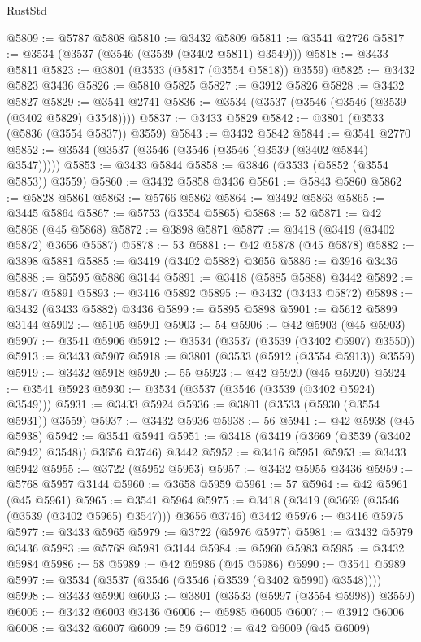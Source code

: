 \begin{lexlean}{RustStd}
\begin{coremodule}
@5809 := @5787 @5808
@5810 := @3432 @5809
@5811 := @3541 @2726
@5817 := @3534 (@3537 (@3546 (@3539 (@3402 @5811) @3549)))
@5818 := @3433 @5811
@5823 := @3801 (@3533 (@5817 (@3554 @5818)) @3559)
@5825 := @3432 @5823 @3436
@5826 := @5810 @5825
@5827 := @3912 @5826
@5828 := @3432 @5827
@5829 := @3541 @2741
@5836 := @3534 (@3537 (@3546 (@3546 (@3539 (@3402 @5829) @3548))))
@5837 := @3433 @5829
@5842 := @3801 (@3533 (@5836 (@3554 @5837)) @3559)
@5843 := @3432 @5842
@5844 := @3541 @2770
@5852 := @3534 (@3537 (@3546 (@3546 (@3546 (@3539 (@3402 @5844) @3547)))))
@5853 := @3433 @5844
@5858 := @3846 (@3533 (@5852 (@3554 @5853)) @3559)
@5860 := @3432 @5858 @3436
@5861 := @5843 @5860
@5862 := @5828 @5861
@5863 := @5766 @5862
@5864 := @3492 @5863
@5865 := @3445 @5864
@5867 := @5753 (@3554 @5865)
@5868 := 52
@5871 := @42 @5868 (@45 @5868)
@5872 := @3898 @5871
@5877 := @3418 (@3419 (@3402 @5872) @3656 @5587)
@5878 := 53
@5881 := @42 @5878 (@45 @5878)
@5882 := @3898 @5881
@5885 := @3419 (@3402 @5882) @3656
@5886 := @3916 @3436
@5888 := @5595 @5886 @3144
@5891 := @3418 (@5885 @5888) @3442
@5892 := @5877 @5891
@5893 := @3416 @5892
@5895 := @3432 (@3433 @5872)
@5898 := @3432 (@3433 @5882) @3436
@5899 := @5895 @5898
@5901 := @5612 @5899 @3144
@5902 := @5105 @5901
@5903 := 54
@5906 := @42 @5903 (@45 @5903)
@5907 := @3541 @5906
@5912 := @3534 (@3537 (@3539 (@3402 @5907) @3550))
@5913 := @3433 @5907
@5918 := @3801 (@3533 (@5912 (@3554 @5913)) @3559)
@5919 := @3432 @5918
@5920 := 55
@5923 := @42 @5920 (@45 @5920)
@5924 := @3541 @5923
@5930 := @3534 (@3537 (@3546 (@3539 (@3402 @5924) @3549)))
@5931 := @3433 @5924
@5936 := @3801 (@3533 (@5930 (@3554 @5931)) @3559)
@5937 := @3432 @5936
@5938 := 56
@5941 := @42 @5938 (@45 @5938)
@5942 := @3541 @5941
@5951 := @3418 (@3419 (@3669 (@3539 (@3402 @5942) @3548)) @3656 @3746) @3442
@5952 := @3416 @5951
@5953 := @3433 @5942
@5955 := @3722 (@5952 @5953)
@5957 := @3432 @5955 @3436
@5959 := @5768 @5957 @3144
@5960 := @3658 @5959
@5961 := 57
@5964 := @42 @5961 (@45 @5961)
@5965 := @3541 @5964
@5975 := @3418 (@3419 (@3669 (@3546 (@3539 (@3402 @5965) @3547))) @3656 @3746) @3442
@5976 := @3416 @5975
@5977 := @3433 @5965
@5979 := @3722 (@5976 @5977)
@5981 := @3432 @5979 @3436
@5983 := @5768 @5981 @3144
@5984 := @5960 @5983
@5985 := @3432 @5984
@5986 := 58
@5989 := @42 @5986 (@45 @5986)
@5990 := @3541 @5989
@5997 := @3534 (@3537 (@3546 (@3546 (@3539 (@3402 @5990) @3548))))
@5998 := @3433 @5990
@6003 := @3801 (@3533 (@5997 (@3554 @5998)) @3559)
@6005 := @3432 @6003 @3436
@6006 := @5985 @6005
@6007 := @3912 @6006
@6008 := @3432 @6007
@6009 := 59
@6012 := @42 @6009 (@45 @6009)

\end{coremodule}
\end{lexlean}
